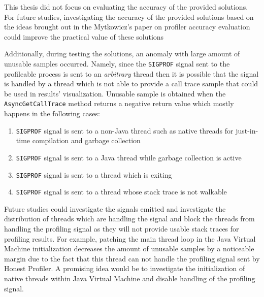 \documentclass[..thesis.tex]{subfiles}
\begin{document}
This thesis did not focus on evaluating the accuracy of the provided solutions. For future studies, investigating the accuracy of the provided solutions based on the ideas brought out in the Mytkowicz's paper on profiler accuracy evaluation \cite{mytkowicz_evaluating_2010} could improve the practical value of these solutions


Additionally, during testing the solutions, an anomaly with large amount of unusable samples occurred. Namely, since the \texttt{SIGPROF} signal sent to the profileable process is sent to an \textit{arbitrary} thread then it is possible that the signal is handled by a thread which is not able to provide a call trace sample that could be used in results' visualization. Unusable sample is obtained when the \texttt{Async\-Get\-Call\-Trace} method returns a negative return value which mostly happens in the following cases:
\begin{enumerate}
	\item \texttt{SIGPROF} signal is sent to a non-Java thread such as native threads for just-in-time compilation and garbage collection
	\item \texttt{SIGPROF} signal is sent to a Java thread while garbage collection is active
	\item \texttt{SIGPROF} signal is sent to a thread which is exiting
	\item \texttt{SIGPROF} signal is sent to a thread whose stack trace is not walkable
\end{enumerate}

Future studies could investigate the signals emitted and investigate the distribution of threads which are handling the signal and block the threads from handling the profiling signal as they will not provide usable stack traces for profiling results.
For example, patching the main thread loop in the Java Virtual Machine initialization decreases the amount of unusable samples by a noticeable margin due to the fact that this thread can not handle the profiling signal sent by Honest Profiler. A promising idea would be to investigate the initialization of native threads within Java Virtual Machine and disable handling of the profiling signal.


\end{document}
